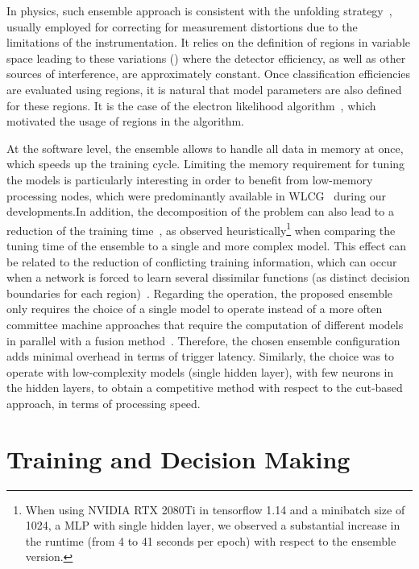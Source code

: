 In physics, such ensemble approach is consistent with the unfolding
strategy~\cite{unfolding_book}, usually employed for correcting for
measurement distortions due to the limitations of the instrumentation. It relies
on the definition of regions in variable space leading to these
variations (\eteta{}) where the detector efficiency, as well as other
sources of interference, are approximately constant. Once classification
efficiencies are evaluated using regions, it is natural that model parameters
are also defined for these regions. It is the case of the electron likelihood
algorithm~\cite{atlas_electron_id_offline}, which motivated the usage of
\eteta{} regions in the \rnn{} algorithm.

At the software level, the ensemble allows to handle all data in memory at once,
which speeds up the training cycle. Limiting the memory requirement for tuning
the models is particularly interesting in order to benefit from low-memory 
 processing nodes, which were predominantly available in 
WLCG~\cite{2015_lcg_tdr} during our
developments.\@ In addition, the decomposition of the problem can also lead to a
reduction of the training time~\cite{Polikar2006}, as observed heuristically\footnote{
  When using NVIDIA RTX 2080Ti in tensorflow 1.14 and a minibatch size of 1024, a 
  MLP with single hidden layer, we observed a substantial increase in the runtime (from 4 
  to 41 seconds per epoch) with respect to the ensemble version.} when
comparing the tuning time of the ensemble to a single and more complex model.
This effect can be related to the reduction of conflicting training information,
which can occur when a network is forced to learn several dissimilar functions
(as distinct decision boundaries for each region)~\cite{Auda1999,haykin_2008}.
Regarding the operation, the proposed ensemble only requires the choice of a
single model to operate instead of a more often committee machine approaches
that require the computation of different models in parallel with a fusion
method~\cite{zhou_ensemble}.  Therefore, the chosen ensemble configuration adds
minimal overhead in terms of trigger latency. Similarly, the choice was to
operate with low-complexity models (single hidden layer), with few neurons in
the hidden layers, to obtain a competitive method with respect to the cut-based
approach, in terms of processing speed.



\section{Training and Decision Making}%
\label{sec:tuning}

